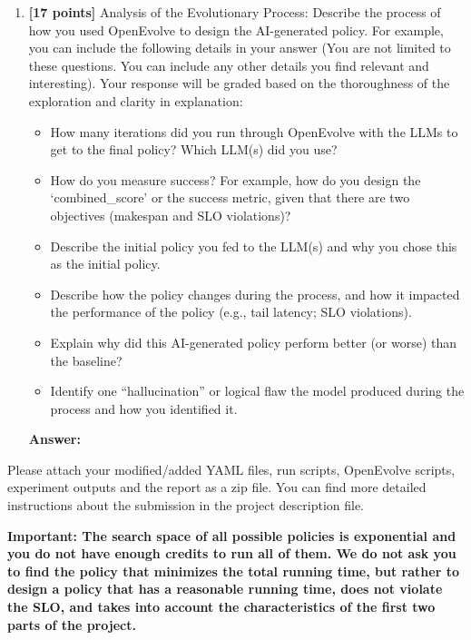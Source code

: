 \begin{enumerate}
\begin{enumerate}
\begin{itemize}
    \textbf{Answer:}
    \item Create two line plots (one for the p95 latency and one for SLO violations) showing policy performance over iterations.
    
    \textbf{Answer:}
    \end{itemize}

    \item \textbf{[17 points]} Analysis of the Evolutionary Process: Describe the process of how you used OpenEvolve to design the AI-generated policy. For example, you can include the following details in your answer (You are not limited to these questions. You can include any other details you find relevant and interesting). Your response will be graded based on the thoroughness of the exploration and clarity in explanation:
        
        \begin{itemize}
            \item How many iterations did you run through OpenEvolve with the LLMs to get to the final policy? Which LLM(s) did you use?
            \item How do you measure success? For example, how do you design the `combined\_score' or the success metric, given that there are two objectives (makespan and SLO violations)?
            \item Describe the initial policy you fed to the LLM(s) and why you chose this as the initial policy.
            \item Describe how the policy changes during the process, and how it impacted the performance of the policy (e.g., tail latency; SLO violations).
            \item Explain why did this AI-generated policy perform better (or worse) than the baseline?
            \item Identify one ``hallucination'' or logical flaw the model produced during the process and how you identified it.
        \end{itemize}

         \textbf{Answer:}


    \end{enumerate}

    Please attach your modified/added YAML files, run scripts, OpenEvolve scripts, experiment outputs and the report as a zip file. You can find more detailed instructions about the submission in the project description file.
    
    \textbf{Important: The search space of all possible policies is exponential and you do not have enough credits to run all of them. We do not ask you to find the policy that minimizes
    the total running time, but rather to design a policy that has a reasonable running time, does not violate the SLO, and takes into account the characteristics of the first two parts of the project.}
\end{enumerate}

\newpage
